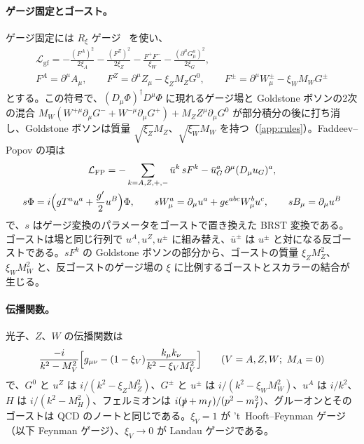 \documentclass[a4paper,10pt]{ltjsarticle}
\begin{document}
\paragraph{ゲージ固定とゴースト。}ゲージ固定には $R_\xi$ ゲージ~\cite{fls72} を使い、
\begin{equation}
\begin{gathered}
\mathcal L_{\mathrm{gf}}=-\frac{(F^A)^2}{2\xi_A}-\frac{(F^Z)^2}{2\xi_Z}-\frac{F^+F^-}{\xi_W}-\frac{(\partial^\mu G^a_\mu)^2}{2\xi_G},\\
F^A=\partial^\mu A_\mu,\qquad F^Z=\partial^\mu Z_\mu-\xi_ZM_ZG^0,\qquad F^\pm=\partial^\mu W^\pm_\mu-\xi_WM_WG^\pm
\end{gathered}
\label{eq:gf}
\end{equation}
とする。この符号で、$(D_\mu\Phi)^\dagger D^\mu\Phi$ に現れるゲージ場と Goldstone ボソンの2次の混合 $M_W(W^{+\mu}\partial_\mu G^-+W^{-\mu}\partial_\mu G^+)+M_ZZ^\mu\partial_\mu G^0$ が部分積分の後に打ち消し、Goldstone ボソンは質量 $\sqrt{\xi_Z}M_Z$、$\sqrt{\xi_W}M_W$ を持つ（\ref{app:rules}）。Faddeev--Popov の項は
\begin{equation}
\begin{gathered}
\mathcal L_{\mathrm{FP}}=-\sum_{k=A,Z,+,-}\bar u^k\,sF^k-\bar u^a_G\,\partial^\mu(D_\mu u_G)^a,\\
s\Phi=i\Bigl(gT^au^a+\frac{g'}2u^B\Bigr)\Phi,\qquad sW^a_\mu=\partial_\mu u^a+g\epsilon^{abc}W^b_\mu u^c,\qquad sB_\mu=\partial_\mu u^B
\end{gathered}
\label{eq:fp}
\end{equation}
で、$s$ はゲージ変換のパラメータをゴーストで置き換えた BRST 変換である。ゴーストは場と同じ行列で $u^A,u^Z,u^\pm$ に組み替え、$\bar u^\pm$ は $u^\pm$ と対になる反ゴーストである。$sF^k$ の Goldstone ボソンの部分から、ゴーストの質量 $\xi_ZM_Z^2$、$\xi_WM_W^2$ と、反ゴーストのゲージ場の $\xi$ に比例するゴーストとスカラーの結合が生じる。

\paragraph{伝播関数。}光子、$Z$、$W$ の伝播関数は
\begin{equation}
\frac{-i}{k^2-M_V^2}\Bigl[g_{\mu\nu}-(1-\xi_V)\frac{k_\mu k_\nu}{k^2-\xi_VM_V^2}\Bigr]
\qquad(V=A,Z,W;\ M_A=0)
\label{eq:propV}
\end{equation}
で、$G^0$ と $u^Z$ は $i/(k^2-\xi_ZM_Z^2)$、$G^\pm$ と $u^\pm$ は $i/(k^2-\xi_WM_W^2)$、$u^A$ は $i/k^2$、$H$ は $i/(k^2-M_H^2)$、フェルミオンは $i(\slashed p+m_f)/(p^2-m_f^2)$、グルーオンとそのゴーストは QCD のノートと同じである。$\xi_V=1$ が 't~Hooft--Feynman ゲージ（以下 Feynman ゲージ）、$\xi_V\to0$ が Landau ゲージである。
\end{document}
